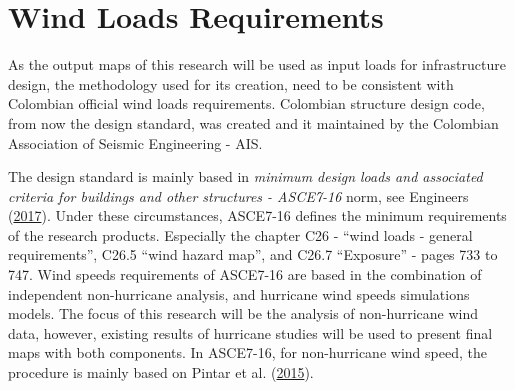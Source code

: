 \documentclass[12pt,oneside]{reedthesis}
\begin{document}
\hypertarget{windloadsrequirements}{%
\section{Wind Loads Requirements}\label{windloadsrequirements}}

As the output maps of this research will be used as input loads for infrastructure design, the methodology used for its creation, need to be consistent with Colombian official wind loads requirements. Colombian structure design code, from now the design standard, was created and it maintained by the Colombian Association of Seismic Engineering - AIS.

The design standard is mainly based in \emph{minimum design loads and associated criteria for buildings and other structures - ASCE7-16} norm, see Engineers (\protect\hyperlink{ref-Asce2017}{2017}). Under these circumstances, ASCE7-16 defines the minimum requirements of the research products. Especially the chapter C26 - ``wind loads - general requirements'', C26.5 ``wind hazard map'', and C26.7 ``Exposure'' - pages 733 to 747. Wind speeds requirements of ASCE7-16 are based in the combination of independent non-hurricane analysis, and hurricane wind speeds simulations models. The focus of this research will be the analysis of non-hurricane wind data, however, existing results of hurricane studies will be used to present final maps with both components. In ASCE7-16, for non-hurricane wind speed, the procedure is mainly based on Pintar et al. (\protect\hyperlink{ref-Pintar2015}{2015}).
\end{document}
